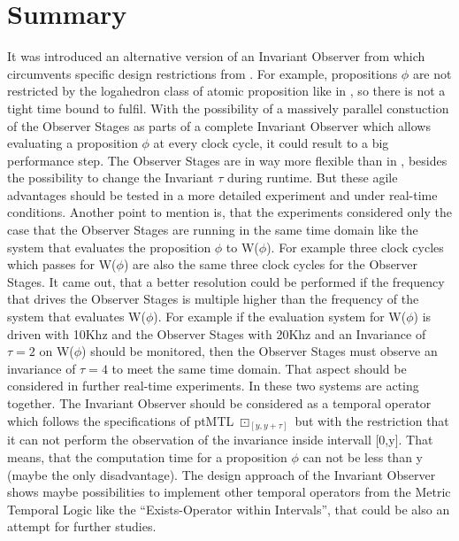 \chapter{Summary}
\label{chapter:5}

\ifpdf
    \graphicspath{{Chapter3/Figs/Raster/}{Chapter3/Figs/PDF/}{Chapter3/Figs/}}
\else
    \graphicspath{{Chapter3/Figs/Vector/}{Chapter3/Figs/}}
\fi

It was introduced an alternative version of an Invariant Observer from \cite{RTFMBJ13} which circumvents specific design restrictions from \cite{RTFMBJ13}.
For example, propositions $\phi$ are not restricted by the logahedron class of atomic proposition like in \cite{RTFMBJ13}, so there is not a tight time bound to fulfil. 
With the possibility of a massively parallel constuction of the Observer Stages as parts of a complete Invariant Observer which allows evaluating a proposition $\phi$ 
at every clock cycle, it could result to a big performance step.
The Observer Stages are in way more flexible than in \cite{RTFMBJ13}, besides the possibility to change the Invariant $\tau$ during runtime. 
But these agile advantages should be tested in a more detailed experiment and under real-time conditions.
Another point to mention is, that the experiments considered only the case that the Observer Stages are running in the same time domain like the system that evaluates the proposition $\phi$ to W($\phi$).
For example three clock cycles which passes for W($\phi$) are also the same three clock cycles for the Observer Stages. It came out, that a better resolution could be performed if
the frequency that drives the Observer Stages is multiple higher than the frequency of the system that evaluates W($\phi$).
For example if the evaluation system for W($\phi$) is driven with 10Khz and the Observer Stages with 20Khz and an Invariance of $\tau = 2$ on W($\phi$) should be monitored, then the Observer Stages must observe an invariance
of $\tau = 4$ to meet the same time domain. That aspect should be considered in further real-time experiments. 
In \cite{RTFMBJ13} these two systems are acting together.
The Invariant Observer should be considered as a temporal operator which follows the specifications of ptMTL $\boxdot _{[ y,y+\tau ]}$ but with the restriction that it can not perform the observation of the 
invariance inside intervall [0,y].
That means, that the computation time for a  proposition $\phi$ can not be less than y (maybe the only disadvantage). 
The design approach of the Invariant Observer shows maybe possibilities to implement other temporal operators from the Metric Temporal Logic like the ``Exists-Operator within Intervals'', 
that could be also an attempt for further studies.




